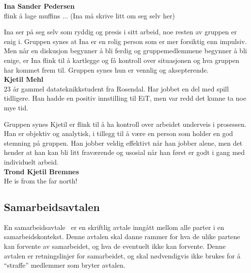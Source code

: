 \textbf{Ina Sander Pedersen}\\
flink å lage muffins ... (Ina må skrive litt om seg selv her)

Ina ser på seg selv som ryddig og presis i sitt arbeid, noe resten av gruppen er enig i. Gruppen synes at Ina er en rolig person som er mer forsiktig enn impulsiv. Men når en diskusjon begynner å bli ferdig og gruppemedlemmene begynner å bli enige, er Ina flink til å kartlegge og få kontroll over situasjonen og hva gruppen har kommet frem til. Gruppen synes hun er vennlig og aksepterende.\\


\textbf{Kjetil Mehl}\\
23 år gammel datateknikkstudent fra Rosendal. Har jobbet en del med
spill tidligere. Han hadde en positiv innstilling til EiT, men var
redd det kunne ta noe mye tid.

Gruppen synes Kjetil er flink til å ha kontroll over arbeidet underveis i prosessen. Han er objektiv og analytisk, i tillegg til å være en person som holder en god stemning på gruppen. Han jobber veldig effektivt når han jobber alene, men det hender at han kan bli litt fraværende og usosial når han først er godt i gang med individuelt arbeid. \\


\textbf{Trond Kjetil Bremnes}\\
He is from the far north! \\

\subsection{Samarbeidsavtalen}
En samarbeidsavtale~\cite{samarbeidsavtale} er en skriftlig avtale
inngått mellom alle parter i en samarbeidskontekst. Denne avtalen skal
danne rammer for hva de ulike partene kan forvente av samarbeidet, og
hva de eventuelt ikke kan forvente. Denne avtalen er retningslinjer for
samarbeidet, og skal nødvendigvis ikke brukes for å ``straffe''
medlemmer som bryter avtalen.


